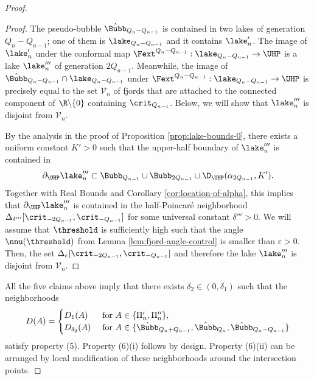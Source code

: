 \documentclass{amsart}
\begin{document}
\begin{proof}
\begin{proof}
        The pseudo-bubble $\hat{\Bubb}_{Q_n-Q_{n-1}}$ is contained in two lakes of generation $Q_n-Q_{n-1}$; one of them is $\lake_{Q_n-Q_{n-1}}$ and it contains $\lake'_n$.
        The image of $\lake'_n$ under the conformal map $\Fext^{Q_n-Q_{n-1}}: \lake_{Q_n-Q_{n-1}} \to \UHP$ is a lake $\lake'''_n$ of generation $2Q_{n-1}$.
        Meanwhile, the image of $\hat{\Bubb}_{Q_n-Q_{n-1}} \cap \lake_{Q_n-Q_{n-1}}$ under $\Fext^{Q_n-Q_{n-1}}: \lake_{Q_n-Q_{n-1}} \to \UHP$ is precisely equal to the set $\mathcal{V}_n$ of fjords that are attached to the connected component of $\R \backslash \{0\}$ containing $\crit_{Q_{n-1}}$.
        Below, we will show that $\lake'''_n$ is disjoint from $\mathcal{V}_n$.
        
        By the analysis in the proof of Proposition \ref{prop:lake-bounds-0}, there exists a uniform constant $K'>0$ such that the upper-half boundary of $\lake'''_n$ is contained in
        \[
            \partial_{\UHP} \lake'''_n \subset \Bubb_{Q_{n-1}} \cup \Bubb_{2Q_{n-1}} \cup \D_{\UHP}(\alpha_{2Q_{n-1}},K').
        \]
        Together with Real Bounds and Corollary \ref{cor:location-of-alpha}, this implies that $\partial_{\UHP} \lake'''_n$ is contained in the half-Poincar\'e neighborhood $\Delta_{\delta'''}[\crit_{-2Q_{n-1}},\crit_{-Q_{n-1}}]$ for some universal constant $\delta'''>0$.
        We will assume that $\threshold$ is sufficiently high such that the angle $\nnu(\threshold)$ from Lemma \ref{lem:fjord-angle-control} is smaller than $\varepsilon>0$.
        Then, the set $\Delta_{\varepsilon}[\crit_{-2Q_{n-1}},\crit_{-Q_{n-1}}]$ and therefore the lake $\lake'''_n$ is disjoint from $\mathcal{V}_n$.
    \end{proof}

    All the five claims above imply that there exists $\delta_2 \in (0,\delta_1)$ such that the neighborhoods
    \[
        D(A) = \begin{cases}
            D_1(A) & \textnormal{ for } A \in \{ \Pi'_n, \Pi''_n \}, \\
            D_{\delta_2}(A) & \textnormal{ for } A \in \{ \hat{\Bubb}_{Q_n+Q_{n-1}}, \hat{\Bubb}_{Q_n}, \hat{\Bubb}_{Q_n-Q_{n-1}} \}
        \end{cases}
    \]
    satisfy property (5).
    Property (6)(i) follows by design.
    Property (6)(ii) can be arranged by local modification of these neighborhoods around the intersection points.
\end{proof}
\end{document}
